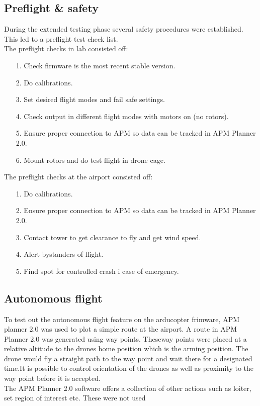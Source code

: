 \subsection{Preflight \& safety}
During the extended testing phase several safety procedures were established. This led to a
preflight test check list.\\
The preflight checks in lab consisted off:
\begin{itemize}
\item[1.] Check firmware is the most recent stable version.
\item[2.] Do calibrations.
\item[3.] Set desired flight modes and fail safe settings.
\item[4.] Check output in different flight modes with motors on (no rotors).
\item[5.] Ensure proper connection to APM so data can be tracked in APM Planner 2.0.
\item[6.] Mount rotors and do test flight in drone cage.
\end{itemize}

The preflight checks at the airport consisted off:
\begin{itemize}
\item[1.] Do calibrations.
\item[2.] Ensure proper connection to APM so data can be tracked in APM Planner 2.0.
\item[3.] Contact tower to get clearance to fly and get wind speed.
\item[4.] Alert bystanders of flight.
\item[5.] Find spot for controlled crash i case of emergency.
\end{itemize}

\subsection{Autonomous flight}
To test out the autonomous flight feature on the arducopter frimware, APM planner 2.0 was used to
plot a simple route at the airport. A route in APM Planner 2.0 was generated using way points.
Theseway points were placed at a relative altitude to the drones home position which is the arming
position. The drone would fly a straight path to the way point and wait there for a designated
time.It is possible to control orientation of the drones as well as proximity to the way point
before it
is accepted.\\
The APM Planner 2.0 software offers a collection of other actions such as loiter, set region of
interest etc. These were not used\\

